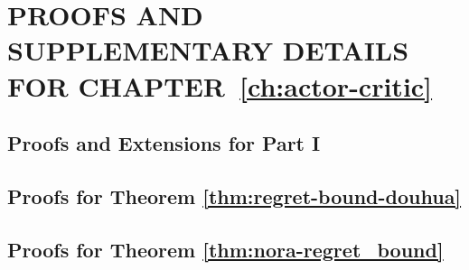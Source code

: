 \chapter{PROOFS AND SUPPLEMENTARY DETAILS FOR CHAPTER~\ref{ch:actor-critic}}
\label{app:actor-critic}


\section{Proofs and Extensions for Part I}
\label{sec:app04-part1}
\section{Proofs for Theorem \ref{thm:regret-bound-douhua}}
\label{app:proof-douhua}
%
\label{lem:regret-decomp-douhua-ac}\label{equ:regret-decompose}\label{eqn:decomp-Qpi-1}\label{eqn:decomp-Qpi-2}\label{eqn:mwu-update}\label{lem:mirror-descent-douhua}\label{eqn:mirror-alg1-tel1}\label{eqn:mirror-alg1-tel2}\label{eqn:mirror-alg1-tel3}\label{eqn:pinsker1}\label{eqn:mirror-alg1-tel4}\label{eqn:kl-unifotm}\label{lem:negative-bellman-decomp-douhua}\label{eqn:decom-bellman}\label{eqn:decom-bellman2}\label{lem:occ-measure-regret-douhua}\label{eqn:bellman-learned}\label{eqn:bellman-learned1}\label{eqn:bellman-learned2}\label{lem:ac-loss-bounded-optimism-pi}\label{app:ac-covering-number}\label{app:closure-truncated-sums}

\section{Proofs for Theorem \ref{thm:nora-regret_bound}}
\label{app:proof-nora}

